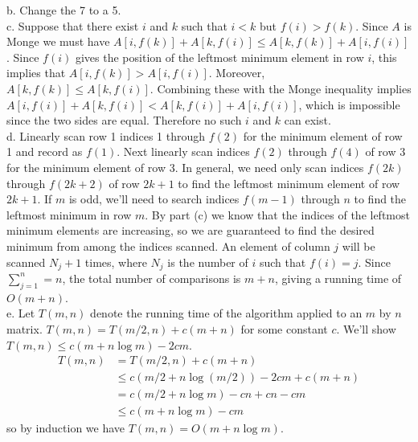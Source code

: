 \documentclass{article}
\begin{document}
b. Change the 7 to a 5. \\

c. Suppose that there exist $i$ and $k$ such that $i < k$ but $f(i) > f(k)$.  Since $A$ is Monge we must have $A[i,f(k)] + A[k,f(i)] \leq A[k,f(k)] + A[i,f(i)]$. Since $f(i)$ gives the position of the leftmost minimum element in row $i$, this implies that $A[i,f(k)] > A[i,f(i)]$.  Moreover, $A[k, f(k)] \leq A[k,f(i)]$.  Combining these with the Monge inequality implies $A[i,f(i)] + A[k,f(i)] < A[k,f(i)] + A[i,f(i)]$, which is impossible since the two sides are equal.  Therefore no such $i$ and $k$ can exist. \\

d.  Linearly scan row 1 indices 1 through $f(2)$ for the minimum element of row 1 and record as $f(1)$.  Next linearly scan indices $f(2)$ through $f(4)$ of row 3 for the minimum element of row 3.  In general, we need only scan indices $f(2k)$ through $f(2k+2)$ of row $2k+1$ to find the leftmost minimum element of row $2k+1$.  If $m$ is odd, we'll need to search indices $f(m-1)$ through $n$ to find the leftmost minimum in row $m$.  By part (c) we know that the indices of the leftmost minimum elements are increasing, so we are guaranteed to find the desired minimum from among the indices scanned. An element of column $j$ will be scanned $N_j + 1$ times, where $N_j$ is the number of $i$ such that $f(i) = j$. Since $\sum_{j=1}^n = n$, the total number of comparisons is $m + n$, giving a running time of $O(m+n)$. \\

e. Let $T(m,n)$ denote the running time of the algorithm applied to an $m$ by $n$ matrix.  $T(m,n) = T(m/2,n) + c(m+n)$ for some constant $c$.  We'll show $T(m,n) \leq c(m + n\log m) - 2cm$.
\begin{align*}
T(m,n) &= T(m/2,n) + c(m+n)\\
&\leq c(m/2 + n\log(m/2)) - 2cm + c(m+n) \\
&= c(m/2 + n\log m) - cn + cn - cm \\
& \leq c(m+n\log m) - cm
\end{align*}
so by induction we have $T(m,n) = O(m+n\log m)$.
\end{document}
